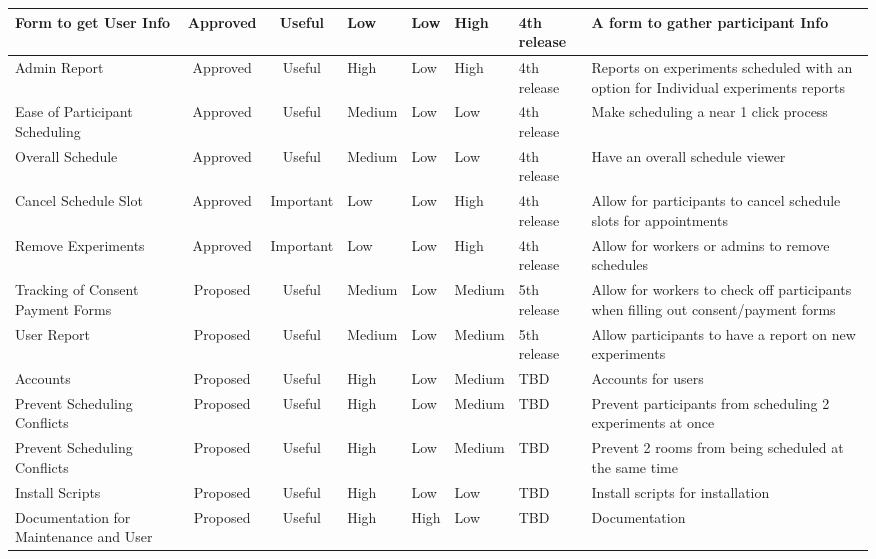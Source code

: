 \documentclass{article}
\begin{document}
\begin{table}[!hb]
\begin{tabular}{|p{2.5cm}|c|c|p{1.25cm}|p{1.5cm}|p{1.5cm}|p{1.25cm}|p{3.25cm}|}
        \hline
        Form to get User Info & Approved & Useful & Low   & Low   & High  & 4th release  & A form to gather participant Info \\
        \hline
        Admin Report & Approved & Useful & High  & Low   & High  & 4th release  & Reports on experiments scheduled with an option for Individual experiments reports \\
        \hline
        Ease of Participant Scheduling & Approved & Useful & Medium & Low   & Low   & 4th release  & Make scheduling a near 1 click process \\
        \hline
        Overall Schedule & Approved & Useful & Medium & Low   & Low   & 4th release  & Have an overall schedule viewer \\
        \hline
        Cancel Schedule Slot & Approved & Important & Low   & Low   & High  & 4th release  & Allow for participants to cancel schedule slots for appointments \\
        \hline
        Remove Experiments & Approved & Important & Low   & Low   & High  & 4th release  & Allow for workers or admins to remove schedules \\
        \hline
        Tracking of Consent Payment Forms & Proposed & Useful & Medium & Low   & Medium & 5th release  & Allow for workers to check off participants when filling out consent/payment forms \\
        \hline
        User Report & Proposed & Useful & Medium & Low   & Medium & 5th release & Allow participants to have a report on new experiments \\
        \hline
        Accounts & Proposed & Useful & High  & Low   & Medium & TBD & Accounts for users \\
        \hline
        Prevent Scheduling Conflicts & Proposed & Useful & High  & Low   & Medium & TBD & Prevent participants from scheduling 2 experiments at once \\
        \hline
        Prevent Scheduling Conflicts & Proposed & Useful & High  & Low   & Medium & TBD  & Prevent 2 rooms from being scheduled at the same time \\
        \hline
        Install Scripts & Proposed & Useful & High  & Low   & Low   & TBD & Install scripts for installation \\
        \hline
        Documentation for Maintenance and User & Proposed & Useful & High  & High  & Low   & TBD  & Documentation \\
        \hline
    \end{tabular}
\end{table}
\end{document}
